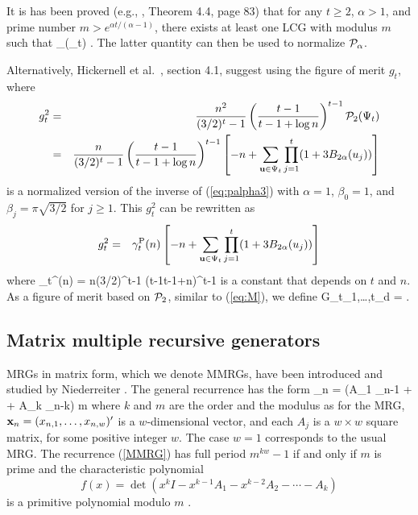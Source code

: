 It is has been proved (e.g., \cite{vSLO94a}, Theorem 4.4, page 83)
that for any $t\ge 2$, $\alpha > 1$, and
prime number $m > e^{\alpha t/(\alpha-1)}$, there exists at least one
LCG with modulus $m$ such that 
\eq
  \cP_\alpha(\Psi_t) .
\endeq
The latter quantity can then be used to normalize ${\cal P}_{\alpha}$.

Alternatively, Hickernell et al.\ \cite{vHIC01a}, section 4.1, 
suggest using the figure of merit $g_t$, where
\begin {eqnarray}
 g_t^2 &=& {n^2\over (3/2)^t-1} \left({t-1\over t-1+\log n}\right)^{t-1}
           {\cal P}_{2}(\Psi_t) \nonumber \\
       &=& {n\over (3/2)^t-1} \left({t-1\over t-1+\log n}\right)^{t-1} 
       \left[-n + \sum_{{\bf u}\in \Psi_t}
       \prod_{j=1}^t (1 + 3 B_{2\alpha}(u_j))\right]
                                                       \label{eq:palpha4}
\end {eqnarray}
is a normalized version of the inverse of (\ref{eq:palpha3}) 
with $\alpha=1$, $\beta_0=1$, and $\beta_j = \pi\sqrt{3/2}$ for $j\ge 1$.
This $g_t^2$ can be rewritten as
\begin {eqnarray}
 g_t^2 &=& \gamma_t^{{\rm P}}(n) 
       \left[-n + \sum_{{\bf u}\in \Psi_t}
       \prod_{j=1}^t (1 + 3 B_{2\alpha}(u_j))\right]
                                                       \label{eq:palpha5}
\end {eqnarray}
where 
\eq
  \gamma_t^{\rmP}(n) 
  = {n\over (3/2)^t-1} \left({t-1\over t-1+\log n}\right)^{t-1} 
\endeq
is a constant that depends on $t$ and $n$.
As a figure of merit based on ${\cal P}_2$, similar to (\ref{eq:M}), we define
\eq
 G_{t_1,\dots,t_d} = \min{}.
                                                            \label{eq:G}
\endeq


\subsection {Matrix multiple recursive generators}

MRGs in matrix form, which we denote MMRGs, have been introduced
and studied by Niederreiter \cite{rNIE95b,rNIE95c}.
The general recurrence has the form
\eq
  \bx_n = (A_1 \bx_{n-1} + \cdots + A_k \bx_{n-k}) \mod m  \label {MMRG}
\endeq
where $k$ and $m$ are the order and the modulus as for the MRG,
${\bf x}_n = (x_{n,1},\dots,x_{n,w})'$ is a $w$-dimensional vector,
and each $A_j$ is a $w\times w$ square matrix, for some positive 
integer $w$.  The case $w=1$ corresponds to the usual MRG.
The recurrence (\ref{MMRG}) has full period $m^{kw}-1$ if and only if
$m$ is prime and the characteristic polynomial
$$
  f(x) = \det\left( x^k I - x^{k-1} A_1 - x^{k-2} A_2 - \cdots - A_k\right)
$$
is a primitive polynomial modulo $m$ \cite{rNIE95b}.

